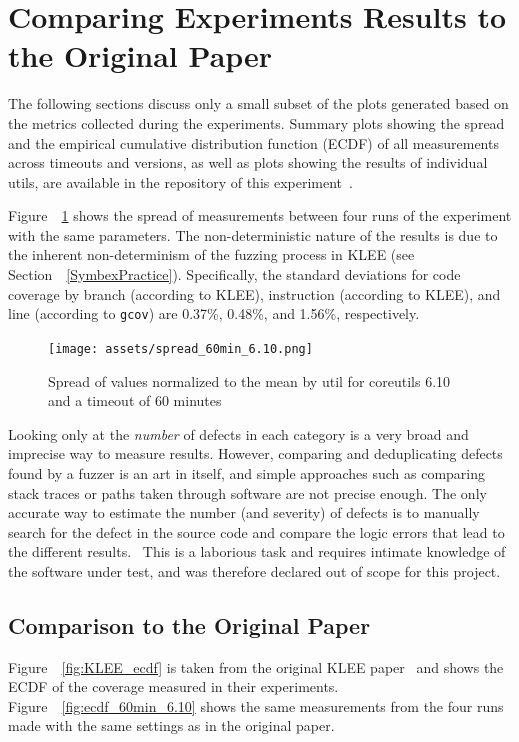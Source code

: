 \documentclass{article}
\let\savedCite=\cite
\renewcommand{\cite}{\unskip~\savedCite}
\let\savedRef=\ref
\renewcommand{\ref}{\unskip~\savedRef}
\begin{document}
\section{Comparing Experiments Results to the Original Paper}
\label{Results}
The following sections discuss only a small subset of the plots generated based on the metrics collected during the experiments. Summary plots showing the spread and the empirical cumulative distribution function (ECDF) of all measurements across timeouts and versions, as well as plots showing the results of individual utils, are available in the repository of this experiment\cite{GitHub}.

Figure~\ref{fig:spread_60min_6.10} shows the spread of measurements between four runs of the experiment with the same parameters. The non-deterministic nature of the results is due to the inherent non-determinism of the fuzzing process in KLEE (see Section~\ref{SymbexPractice}). Specifically, the standard deviations for code coverage by branch (according to KLEE), instruction (according to KLEE), and line (according to \lstinline{gcov}) are 0.37\%, 0.48\%, and 1.56\%, respectively.

\begin{figure}[htbp]
    \centering
    \texttt{[image: assets/spread\_60min\_6.10.png]}
    \caption{Spread of values normalized to the mean by util for coreutils 6.10 and a timeout of 60 minutes}
    \label{fig:spread_60min_6.10}
\end{figure}

Looking only at the \textit{number} of defects in each category is a very broad and imprecise way to measure results. However, comparing and deduplicating defects found by a fuzzer is an art in itself, and simple approaches such as comparing stack traces or paths taken through software are not precise enough. The only accurate way to estimate the number (and severity) of defects is to manually search for the defect in the source code and compare the logic errors that lead to the different results.\cite{EvaluatingFuzzTesting} This is a laborious task and requires intimate knowledge of the software under test, and was therefore declared out of scope for this project.

\subsection{Comparison to the Original Paper}

Figure~\ref{fig:KLEE_ecdf} is taken from the original KLEE paper\cite{KLEE} and shows the ECDF of the coverage measured in their experiments. Figure~\ref{fig:ecdf_60min_6.10} shows the same measurements from the four runs made with the same settings as in the original paper.
\end{document}
